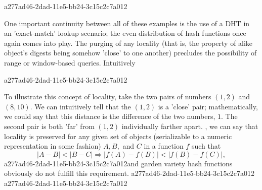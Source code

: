 \documentclass[12pt]{article}
\begin{document}
a277ad46-2dad-11e5-bb24-3c15c2c7a012\par One important continuity between all of these examples is the use of a DHT in an 'exact-match' lookup scenario; the even distribution of hash functions once again comes into play. The purging of any locality (that is, the property of alike object's digests being somehow 'close' to one another) precludes the possibility of range or window-based queries. Intuitively

a277ad46-2dad-11e5-bb24-3c15c2c7a012\par To illustrate this concept of locality, take the two pairs of numbers $(1,2)$ and $(8,10)$. We can intuitively tell that the $(1,2)$ is a 'close' pair; mathematically, we could say that this distance is the difference of the two numbers, $1$. The second pair is both 'far' from $(1,2)$ individually farther apart. , we can say that locality is preserved for any given set of objects (serializable to a numeric representation in some fashion) $A,B,$ and $C$ in a function $f$ such that
\begin{equation}
|A-B| < |B-C| \Rightarrow |f(A)-f(B)| < |f(B) - f(C)|,
\end{equation}
a277ad46-2dad-11e5-bb24-3c15c2c7a012and garden variety hash functions obviously do not fulfill this requirement.
a277ad46-2dad-11e5-bb24-3c15c2c7a012
a277ad46-2dad-11e5-bb24-3c15c2c7a012\printbibliography
\end{document}
